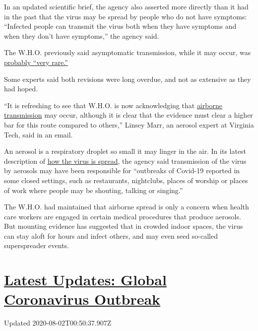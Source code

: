 In an updated scientific brief, the agency also asserted more directly
than it had in the past that the virus may be spread by people who do
not have symptoms: ``Infected people can transmit the virus both when
they have symptoms and when they don't have symptoms,'' the agency said.

The W.H.O. previously said asymptomatic transmission, while it may
occur, was
\href{https://www.nytimes.com/2020/06/09/health/coronavirus-asymptomatic-world-health-organization.html}{probably
``very rare.''}

Some experts said both revisions were long overdue, and not as extensive
as they had hoped.

``It is refreshing to see that W.H.O. is now acknowledging that
\href{https://www.nytimes.com/2020/07/06/health/coronavirus-airborne-aerosols.html}{airborne
transmission} may occur, although it is clear that the evidence must
clear a higher bar for this route compared to others,'' Linsey Marr, an
aerosol expert at Virginia Tech, said in an email.

An aerosol is a respiratory droplet so small it may linger in the air.
In its latest description of
\href{https://www.who.int/news-room/q-a-detail/q-a-how-is-covid-19-transmitted}{how
the virus is spread}, the agency said transmission of the virus by
aerosols may have been responsible for ``outbreaks of Covid-19 reported
in some closed settings, such as restaurants, nightclubs, places of
worship or places of work where people may be shouting, talking or
singing.''

The W.H.O. had maintained that airborne spread is only a concern when
health care workers are engaged in certain medical procedures that
produce aerosols. But mounting evidence has suggested that in crowded
indoor spaces, the virus can stay aloft for hours and infect others, and
may even seed so-called superspreader events.

\hypertarget{latest-updates-global-coronavirus-outbreak}{%
\section{\texorpdfstring{\href{https://www.nytimes.com/2020/08/01/world/coronavirus-covid-19.html?action=click\&pgtype=Article\&state=default\&region=MAIN_CONTENT_1\&context=storylines_live_updates}{Latest
Updates: Global Coronavirus
Outbreak}}{Latest Updates: Global Coronavirus Outbreak}}\label{latest-updates-global-coronavirus-outbreak}}

Updated 2020-08-02T00:50:37.907Z

